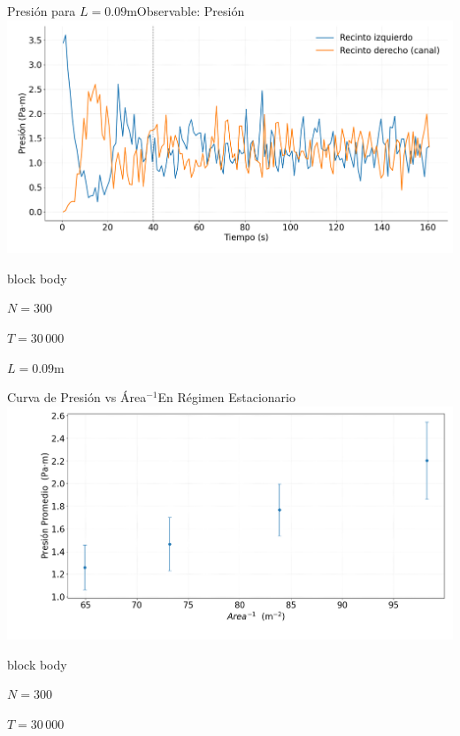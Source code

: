 \documentclass{beamer}
\begin{document}
\begin{frame}{Presión para $L=0.09$m}{Observable: Presión}
    \includegraphics[width=\linewidth]{resources/presion-recintos-L009.png}
    \begin{beamercolorbox}[sep=5pt,center]{block body}
        \begin{minipage}[t]{0.3\textwidth}
            \centering
            \small{$N=300$}
        \end{minipage}
        \hfill
        \begin{minipage}[t]{0.3\textwidth}
            \centering
            \small{$T=30\,000$}
        \end{minipage}
        \hfill
        \begin{minipage}[t]{0.3\textwidth}
            \centering
            \small{$L = 0.09$m}
        \end{minipage}
    \end{beamercolorbox}
\end{frame}

\begin{frame}{Curva de Presión vs Área$^{-1}$}{En Régimen Estacionario}  
    \centering
    \includegraphics[width=\linewidth]{resources/presion-area.png}
    \begin{beamercolorbox}[sep=5pt,center]{block body}
        \begin{minipage}[t]{0.3\textwidth}
            \centering
            \small{$N=300$}
        \end{minipage}
        \hfill
        \begin{minipage}[t]{0.3\textwidth}
            \centering
            \small{$T=30\,000$}
        \end{minipage}
    \end{beamercolorbox}
\end{frame}
\end{document}
